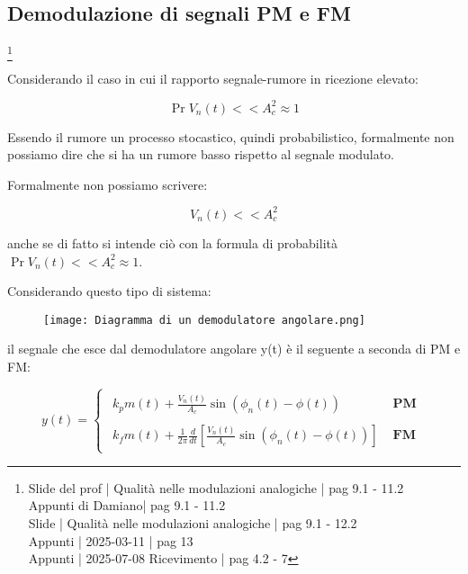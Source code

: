 \newpage 

\subsection{Demodulazione di segnali PM e FM}
\footnote{Slide del prof | Qualità nelle modulazioni analogiche | pag 9.1 - 11.2\\  
Appunti di Damiano| pag 9.1 - 11.2\\
Slide | Qualità nelle modulazioni analogiche | pag 9.1 - 12.2 \\
Appunti | 2025-03-11 | pag 13 \\
Appunti | 2025-07-08 Ricevimento | pag 4.2 - 7
} 

Considerando il caso in cui il rapporto segnale-rumore in ricezione elevato: 

{
    \Large 
    \begin{equation}
        \Pr{V_n (t) << A_c ^{2}} \approx 1
    \end{equation}
}

\begin{tcolorbox}
Essendo il rumore un processo stocastico, quindi probabilistico, 
formalmente non possiamo dire che si ha un rumore basso rispetto al segnale modulato. \newline 

Formalmente non possiamo scrivere: 

{
    \Large 
    \begin{equation}
        V_n (t) << A_c ^{2}
    \end{equation}
}

anche se di fatto si intende ciò con la formula di probabilità $\Pr{V_n (t) << A_c ^{2}} \approx 1$. 
\end{tcolorbox}

Considerando questo tipo di sistema: 

\begin{figure}[h]
    \centering
    \texttt{[image: Diagramma di un demodulatore angolare.png]}
\end{figure}

il segnale che esce dal demodulatore angolare y(t) è il seguente a seconda di PM e FM: 

{
    \Large 
    \begin{equation}
        y(t)
        = 
        \begin{cases}
            \begin{array}{ll}
            k_p m(t) + \frac{V_n (t)}{A_c} \sin(\phi_n (t) - \phi (t)) & \textbf{ PM} 
            \\
            \\
            k_f m(t) + \frac{1}{2 \pi} \frac{d}{dt} \left[ \frac{V_n (t)}{A_c} \sin(\phi_n (t) - \phi (t)) \right] & \textbf{ FM}
            \end{array} 
        \end{cases}
    \end{equation}
}


